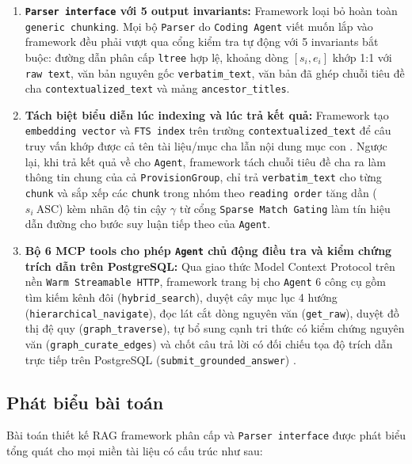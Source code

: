 \begin{enumerate}
    \item \textbf{\texttt{Parser interface} với 5 output invariants:} Framework loại bỏ hoàn toàn \texttt{generic chunking}. Mọi bộ \texttt{Parser} do \texttt{Coding Agent} viết muốn lắp vào framework đều phải vượt qua cổng kiểm tra tự động với 5 invariants bắt buộc: đường dẫn phân cấp \texttt{ltree} hợp lệ, khoảng dòng $[s_i, e_i]$ khớp 1:1 với \texttt{raw text}, văn bản nguyên gốc \texttt{verbatim\_text}, văn bản đã ghép chuỗi tiêu đề cha \texttt{contextualized\_text} và mảng \texttt{ancestor\_titles}.
    \item \textbf{Tách biệt biểu diễn lúc indexing và lúc trả kết quả:} Framework tạo \texttt{embedding vector} và \texttt{FTS index} trên trường \texttt{contextualized\_text} để câu truy vấn khớp được cả tên tài liệu/mục cha lẫn nội dung mục con \cite{anthropic2024contextual}. Ngược lại, khi trả kết quả về cho \texttt{Agent}, framework tách chuỗi tiêu đề cha ra làm thông tin chung của cả \texttt{Provision\allowbreak Group}, chỉ trả \texttt{verbatim\_\allowbreak text} cho từng \texttt{chunk} và sắp xếp các \texttt{chunk} trong nhóm theo \texttt{reading order} tăng dần ($s_i\ \text{ASC}$) kèm nhãn độ tin cậy $\gamma$ từ cổng \texttt{Sparse Match Gating} làm tín hiệu dẫn đường cho bước suy luận tiếp theo của \texttt{Agent}.
    \item \textbf{Bộ 6 MCP tools cho phép \texttt{Agent} chủ động điều tra và kiểm chứng trích dẫn trên PostgreSQL:} Qua giao thức Model Context Protocol \cite{anthropic2024mcp} trên nền \texttt{Warm Streamable HTTP}, framework trang bị cho \texttt{Agent} 6 công cụ gồm tìm kiếm kênh đôi (\texttt{hybrid\_\allowbreak search}), duyệt cây mục lục 4 hướng (\texttt{hierarchical\_\allowbreak navigate}), đọc lát cắt dòng nguyên văn (\texttt{get\_\allowbreak raw}), duyệt đồ thị đệ quy (\texttt{graph\_\allowbreak traverse}), tự bổ sung cạnh tri thức có kiểm chứng nguyên văn (\texttt{graph\_\allowbreak curate\_\allowbreak edges}) và chốt câu trả lời có đối chiếu tọa độ trích dẫn trực tiếp trên PostgreSQL (\texttt{submit\_\allowbreak grounded\_\allowbreak answer}) \cite{lewis2020rag, edge2024graphrag}.
\end{enumerate}

\subsection{Phát biểu bài toán}
Bài toán thiết kế RAG framework phân cấp và \texttt{Parser interface} được phát biểu tổng quát cho mọi miền tài liệu có cấu trúc như sau:

